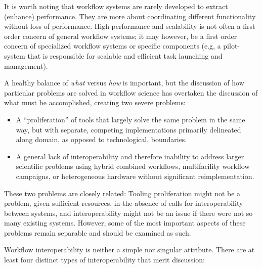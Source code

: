 It is worth noting that workflow systems are rarely developed to extract
(enhance) performance. They are more about coordinating different
functionality without loss of performance. High-performance and scalability is
not often a first order concern of general workflow systems; it may however,
be a first order concern of specialized workflow systems or specific
components (e.g, a pilot-system that is responsible for scalable and efficient
task launching and management).

A healthy balance of \textit{what} versus \textit{how} is
important, but the discussion of how particular problems are
solved in workflow science has overtaken the discussion of what must be
accomplished, creating two severe problems: \begin{itemize} \item A
``proliferation'' of tools that largely solve the same problem in the same way,
but with separate, competing implementations primarily delineated along domain,
as opposed to technological, boundaries.  \item A general lack of
interoperability and therefore inability to address larger scientific problems
using hybrid combined workflows, multifacility workflow campaigns, or
heterogeneous hardware without significant reimplementation.  \end{itemize}

These two problems are closely related: Tooling proliferation might not be a
problem, given sufficient resources, in the absence of calls for
interoperability between systems, and interoperability might not be an issue if
there were not so many existing systems. However, some of the most important
aspects of these problems remain separable and should be examined as such.

Workflow interoperability is neither a simple nor singular attribute. There
are at least four distinct types of interoperability that merit discussion:


